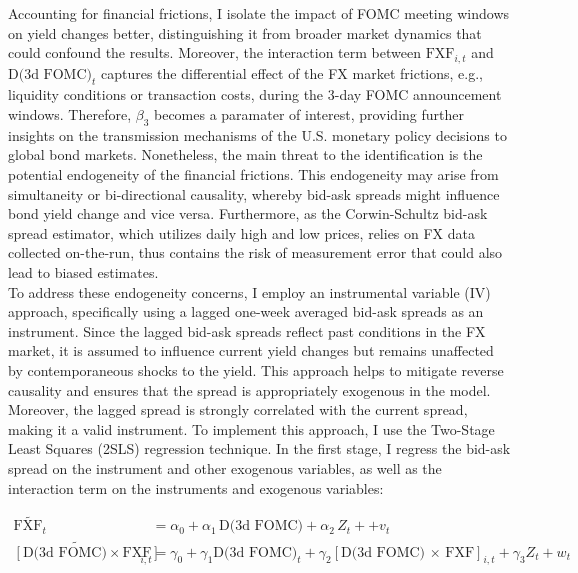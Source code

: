 Accounting for financial frictions, I isolate the impact of FOMC meeting windows on yield changes better, distinguishing it from broader market dynamics that could confound the 
results. Moreover, the interaction term between $\textrm{FXF}_{i,t}$ and $\textrm{D(3d FOMC)}_t$ captures the differential effect of the FX market frictions, e.g., liquidity conditions or transaction costs, during the 3-day FOMC announcement windows. Therefore, $\beta_3$ becomes a paramater of interest, providing further insights on the transmission mechanisms of the U.S. monetary policy decisions to global bond markets. Nonetheless, the main threat to the identification is the potential endogeneity of the financial frictions. This endogeneity may arise from simultaneity or bi-directional causality, whereby bid-ask spreads might influence bond yield change and vice versa. Furthermore, as the Corwin-Schultz bid-ask spread estimator, which utilizes daily high and low prices, relies on FX data collected on-the-run, thus contains the risk of measurement error that could also lead to biased estimates. \\

To address these endogeneity concerns, I employ an instrumental variable (IV) approach, specifically using a lagged one-week averaged bid-ask spreads as an instrument. Since the lagged bid-ask spreads reflect past conditions in the FX market, it is assumed to influence current yield changes but remains unaffected by contemporaneous shocks to the yield. This approach helps to mitigate reverse causality and ensures that the spread is appropriately exogenous in the model. Moreover, the lagged spread is strongly correlated with the current spread, making it a valid instrument. To implement this approach, I use the Two-Stage Least Squares (2SLS) regression technique. In the first stage, I regress the bid-ask spread on the instrument and other exogenous variables, as well as the interaction term on the instruments and exogenous variables:

$$
\begin{aligned}
    \widetilde{\textrm{FXF}_t} & = \alpha_0 + \alpha_1 \,\textrm{D(3d FOMC)} + \alpha_2\, Z_t +  + v_t \\
    \widetilde{[\textrm{D(3d FOMC})\times\textrm{FXF}]_{i,t}} &= \gamma_0 + \gamma_1 \textrm{D(3d FOMC)}_t + \gamma_2 [\textrm{D(3d FOMC})\,\times\,\textrm{FXF}]_{i,t} + \gamma_3 Z_t + w_t
\end{aligned}
$$
\vspace{-0.25cm}

